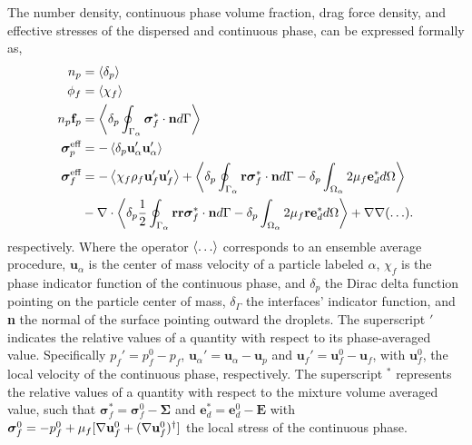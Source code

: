 The number density, continuous phase volume fraction, drag force density, and effective stresses of the dispersed and continuous phase, can be expressed formally as,
\begin{align}
    n_p &= \pavg{}
    \label{eq:n_p}\\
    \phi_f &= \avg{\chi_f}
    \label{eq:chi_f}\\
    n_p \textbf{f}_p  &= \pSavg{\bm\sigma^*_f\cdot \textbf{n}}
    \label{eq:f_alpha}
    \\
    \bm{\sigma}_p^{\text{eff}} &= -\pavg{\textbf{u}_\alpha'\textbf{u}_\alpha'}
    \label{eq:def_uup}
    \\
    \bm{\sigma}^{\text{eff}}_f 
    &= 
    - \avg{\chi_f\rho_f \textbf{u}_f'\textbf{u}_f'} 
    + \pavg{\intS{\textbf{r}\bm\sigma^{*}_f\cdot \textbf{n}} - \delta_p\intO{2\mu_f\textbf{e}_d^*}}\nonumber\\
    &- \div
        \pavg{ \frac{1}{2}\intS{\textbf{rr}\bm\sigma^{*}_f\cdot \textbf{n}}
        - \delta_p\intO{2\mu_f \textbf{r} \textbf{e}_d^*}}
        + \grad\grad (\ldots). 
    \label{eq:def_sigma_eff_f}
\end{align}
respectively. 
Where the operator $\left<\ldots\right>$ corresponds to an ensemble average procedure, 
$\textbf{u}_\alpha$ is the center of mass velocity of a particle labeled $\alpha$, $\chi_f$ is the phase indicator function of the continuous phase, and $\delta_p$ the Dirac delta function pointing on the particle center of mass, $\delta_\Gamma$ the interfaces' indicator function, and \textbf{n} the normal of the surface pointing outward the droplets. 
The superscript $'$ indicates the relative values of a quantity with respect to its phase-averaged value. 
Specifically $p_f' = p_f^0 - p_f$, $\textbf{u}_\alpha' = \textbf{u}_\alpha - \textbf{u}_p$ and $\textbf{u}_f' = \textbf{u}_f^0  -\textbf{u}_f$, with $\textbf{u}_f^0$,  the local velocity of the continuous phase, respectively. 
The superscript $^*$ represents the relative values of a quantity with respect to the mixture volume averaged value, such that $\bm{\sigma}_f^* = \bm{\sigma}_f^0  - \bm{\Sigma}$ and $\textbf{e}_d^* = \textbf{e}_d^0 - \textbf{E}$ with $\bm{\sigma}_f^0 = -p_f^0 + \mu_f [\mathbf{\nabla} \textbf{u}_f^0 + (\mathbf{\nabla} \textbf{u}_f^0)^\dagger]$ the local stress of the continuous phase. 




